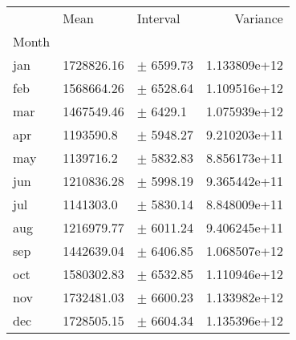 \begin{tabular}{lllr}
\toprule
{} &        Mean &        Interval &      Variance \\
Month &             &                 &               \\
\midrule
jan   &  1728826.16 &   $\pm$ 6599.73 &  1.133809e+12 \\
feb   &  1568664.26 &   $\pm$ 6528.64 &  1.109516e+12 \\
mar   &  1467549.46 &    $\pm$ 6429.1 &  1.075939e+12 \\
apr   &   1193590.8 &   $\pm$ 5948.27 &  9.210203e+11 \\
may   &   1139716.2 &   $\pm$ 5832.83 &  8.856173e+11 \\
jun   &  1210836.28 &   $\pm$ 5998.19 &  9.365442e+11 \\
jul   &   1141303.0 &   $\pm$ 5830.14 &  8.848009e+11 \\
aug   &  1216979.77 &   $\pm$ 6011.24 &  9.406245e+11 \\
sep   &  1442639.04 &   $\pm$ 6406.85 &  1.068507e+12 \\
oct   &  1580302.83 &   $\pm$ 6532.85 &  1.110946e+12 \\
nov   &  1732481.03 &   $\pm$ 6600.23 &  1.133982e+12 \\
dec   &  1728505.15 &   $\pm$ 6604.34 &  1.135396e+12 \\
\bottomrule
\end{tabular}
